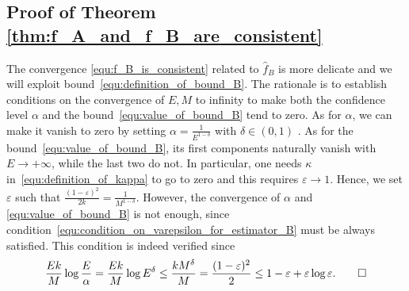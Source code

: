 \documentclass[10pt,twocolumn,twoside]{IEEEtran}					%
\theoremstyle	{plain}
\begin{document}
\subsection{Proof of Theorem \ref{thm:f_A_and_f_B_are_consistent}} 

The convergence \eqref{equ:f_B_is_consistent} related to $\widehat{f}_{B}$ is more delicate and we will exploit bound~\eqref{equ:definition_of_bound_B}. The rationale is to establish conditions on the convergence of $E,M$ to infinity to make both the confidence level $\alpha$ and the bound~\eqref{equ:value_of_bound_B} tend to zero. As for $\alpha$, we can make it vanish to zero by setting $\alpha = \frac{1}{E^{1-\delta}}$ with $\delta\in(0,1)$ . As for the bound~\eqref{equ:value_of_bound_B}, its first components naturally vanish with $E \rightarrow +\infty$, while the last two do not. In particular, one needs $\kappa$ in~\eqref{equ:definition_of_kappa} to go to zero and this requires $\varepsilon \rightarrow 1$. Hence, we set $\varepsilon$ such that $\frac{(1-\varepsilon)^2}{2k} = \frac{1}{M^{1-\delta}}$. However, the convergence of $\alpha$ and \eqref{equ:value_of_bound_B} is not enough, since condition~\eqref{equ:condition_on_varepsilon_for_estimator_B} must be always satisfied. This condition is indeed verified since
$$
	\frac{Ek}{M}\log\frac{E}{\alpha}
	=
	\frac{Ek}{M}\log E^\delta\leq \frac{kM^\delta}{M}
	=
	\frac{(1-\varepsilon)^2}{2}\leq 1-\varepsilon+\varepsilon\log\varepsilon.
	\qed
$$




\end{document}
